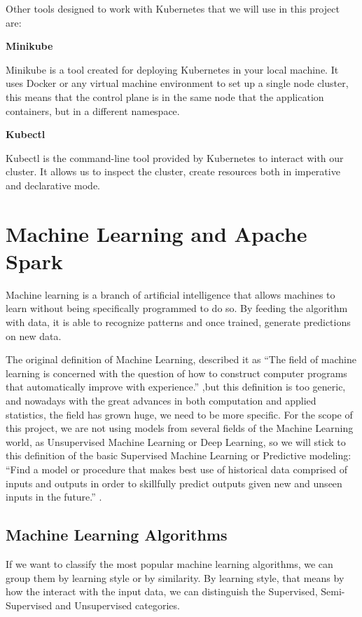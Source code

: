 Other tools designed to work with Kubernetes that we will use in this project are:

\textbf{Minikube}

Minikube \cite{minikube} is a tool created for deploying Kubernetes in your local machine. It uses Docker or any virtual machine environment to set up a single node cluster, this means that the control plane is in the same node that the application containers, but in a different namespace.

\textbf{Kubectl}

Kubectl is the command-line tool provided by Kubernetes to interact with our cluster. It allows us to inspect the cluster, create resources both in imperative and declarative mode.


\section{Machine Learning and Apache Spark}
\label{section:ML}

Machine learning is a branch of artificial intelligence that allows machines to learn without being specifically programmed to do so. By feeding the algorithm with data, it is able to recognize patterns and once trained, generate predictions on new data.

The original definition of Machine Learning, described it as “The field of machine learning is concerned with the question of how to construct computer programs that automatically improve with experience.” \cite{mitchell1997machine},but this definition is too generic, and nowadays with the great advances in both computation and applied statistics, the field has grown huge, we need to be more specific. For the scope of this project, we are not using models from several fields of the Machine Learning world, as Unsupervised Machine Learning or Deep Learning, so we will stick to this definition of the basic Supervised Machine Learning or Predictive modeling: “Find a model or procedure that makes best use of historical data comprised of inputs and outputs in order to skillfully predict outputs given new and unseen inputs in the future.” \cite{brownlee_2019}.

\subsection{Machine Learning Algorithms}

If we want to classify the most popular machine learning algorithms, we can group them by learning style or by similarity. By learning style, that means by how the interact with the input data, we can distinguish the Supervised, Semi-Supervised and Unsupervised categories.

